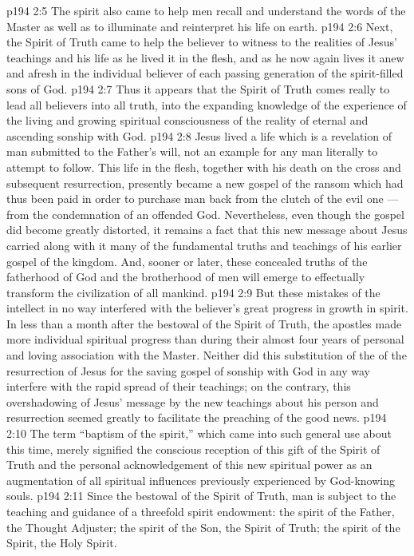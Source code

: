 \vs p194 2:5 The spirit also came to help men recall and understand the words of the Master as well as to illuminate and reinterpret his life on earth.
\vs p194 2:6 Next, the Spirit of Truth came to help the believer to witness to the realities of Jesus’ teachings and his life as he lived it in the flesh, and as he now again lives it anew and afresh in the individual believer of each passing generation of the spirit\hyp{}filled sons of God.
\vs p194 2:7 Thus it appears that the Spirit of Truth comes really to lead all believers into all truth, into the expanding knowledge of the experience of the living and growing spiritual consciousness of the reality of eternal and ascending sonship with God.
\vs p194 2:8 \pc Jesus lived a life which is a revelation of man submitted to the Father’s will, not an example for any man literally to attempt to follow. This life in the flesh, together with his death on the cross and subsequent resurrection, presently became a new gospel of the ransom which had thus been paid in order to purchase man back from the clutch of the evil one --- from the condemnation of an offended God. Nevertheless, even though the gospel did become greatly distorted, it remains a fact that this new message about Jesus carried along with it many of the fundamental truths and teachings of his earlier gospel of the kingdom. And, sooner or later, these concealed truths of the fatherhood of God and the brotherhood of men will emerge to effectually transform the civilization of all mankind.
\vs p194 2:9 But these mistakes of the intellect in no way interfered with the believer’s great progress in growth in spirit. In less than a month after the bestowal of the Spirit of Truth, the apostles made more individual spiritual progress than during their almost four years of personal and loving association with the Master. Neither did this substitution of the  of the resurrection of Jesus for the saving gospel  of sonship with God in any way interfere with the rapid spread of their teachings; on the contrary, this overshadowing of Jesus’ message by the new teachings about his person and resurrection seemed greatly to facilitate the preaching of the good news.
\vs p194 2:10 \pc The term “baptism of the spirit,” which came into such general use about this time, merely signified the conscious reception of this gift of the Spirit of Truth and the personal acknowledgement of this new spiritual power as an augmentation of all spiritual influences previously experienced by God\hyp{}knowing souls.
\vs p194 2:11 \pc Since the bestowal of the Spirit of Truth, man is subject to the teaching and guidance of a threefold spirit endowment: the spirit of the Father, the Thought Adjuster; the spirit of the Son, the Spirit of Truth; the spirit of the Spirit, the Holy Spirit.

